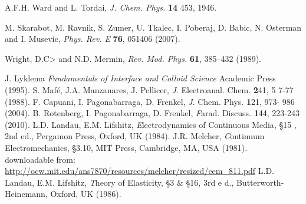 \begin{thebibliography}{99}
A.F.H. Ward and L. Tordai,
\textit{J. Chem. Phys.} \textbf{14} 453, 1946.

M. Skarabot, M. Ravnik, S. Zumer, U. Tkalec, I. Poberaj, D. Babic, N. Osterman and I. Musevic,
\textit{Phys. Rev. E} \textbf{76}, 051406 (2007).

Wright, D.C> and N.D. Mermin,
\textit{Rev. Mod. Phys.} \textbf{61}, 385--432 (1989).

 J. Lyklema {\em Fundamentals of Interface and Colloid Science} Academic Press     (1995).
 S. Maf\'e, J.A. Manzanares, J. Pellicer, {\textit J. Electroanal. Chem.} {\textbf 241}, 5    7-77 (1988).
 F. Capuani, I. Pagonabarraga, D. Frenkel, {\textit J. Chem. Phys.} {\textbf 121}, 973-    986 (2004).
 B. Rotenberg, I. Pagonabarraga, D. Frenkel, {\textit Farad. Discuss.} {\textbf 144},     223-243 (2010).
 L.D. Landau, E.M. Lifshitz, {\textit Electrodynamics of Continuous Media}, \S 15    , 2nd ed., Pergamon Press, Oxford, UK (1984).
 J.R. Melcher, {\textit Continuum Electromechanics}, \S 3.10, MIT Press, Cambridge,     MA, USA (1981).\\
downloadable from:\\
\url{http://ocw.mit.edu/ans7870/resources/melcher/resized/cem_811.pdf}
 L.D. Landau, E.M. Lifshitz, {\textit Theory of Elasticity}, \S 3 \& \S 16, 3rd e    d., Butterworth-Heinemann, Oxford, UK (1986).



\end{thebibliography}



